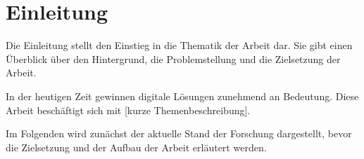 \section{Einleitung}

Die Einleitung stellt den Einstieg in die Thematik der Arbeit dar. Sie gibt einen Überblick über den Hintergrund, die Problemstellung und die Zielsetzung der Arbeit.

In der heutigen Zeit gewinnen digitale Lösungen zunehmend an Bedeutung. Diese Arbeit beschäftigt sich mit [kurze Themenbeschreibung].

Im Folgenden wird zunächst der aktuelle Stand der Forschung dargestellt, bevor die Zielsetzung und der Aufbau der Arbeit erläutert werden.

